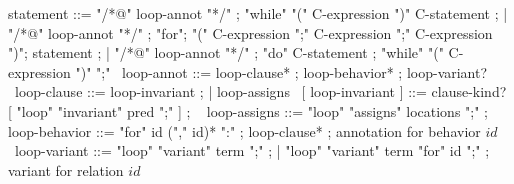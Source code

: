 \begin{syntax}
  statement ::= "/*@" loop-annot "*/" ;
  "while" "(" C-expression ")" C-statement ;
  | "/*@" loop-annot "*/" ;
    "for";
  "(" C-expression ";" C-expression ";" C-expression ")";
  statement ;
  | "/*@" loop-annot "*/" ;
  "do" C-statement ;
  "while" "(" C-expression ")" ";"
  \
  loop-annot ::= loop-clause* ;
  { loop-behavior* } ;
  loop-variant?
  \
  loop-clause ::= loop-invariant ;
                | { loop-assigns }
  \
  [ loop-invariant ] ::= { clause-kind? } [ "loop" "invariant" pred ";" ] ;
  \
  { loop-assigns } ::= { "loop" "assigns" locations ";" } ;
  \
  { loop-behavior } ::= { "for" id ("," id)* ":" } ;
  { loop-clause* } ; \hspace{-35mm} annotation for behavior $id$
  \
  loop-variant ::= "loop" "variant" term ";" ;
  | "loop" "variant" term "for" id ";" ;  \hspace{-35mm} variant for relation $id$
\end{syntax}

